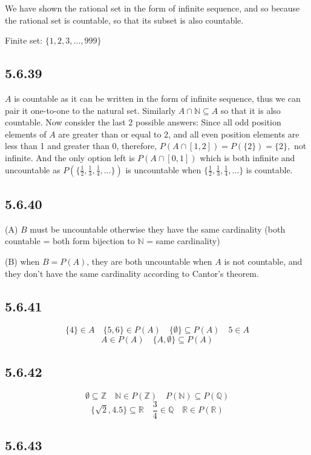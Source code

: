 \documentclass{article}
\begin{document}
We have shown the rational set in the form of infinite sequence, and so because the rational set is countable, so that its subset is also countable.

Finite set: $\{1, 2, 3,\ldots, 999\}$

\subsection*{5.6.39}

$A$ is countable as it can be written in the form of infinite sequence, thus we can pair it one-to-one to the natural set. Similarly $A\cap\mathbb{N}\subseteq A$ so that it is also countable.  Now consider the last 2 possible answers: Since all odd position elements of $A$ are greater than or equal to 2, and all even position elements are less than 1 and greater than 0, therefore, $P(A\cap[1,2])=P(\{2\})=\{2\},$ not infinite. And the only option left is $P(A\cap[0,1])$ which is both infinite and uncountable as $P(\{\frac12,\frac13,\frac14,\ldots\})$ is uncountable when $\{\frac12,\frac13,\frac14,\ldots\}$ is countable. 

\subsection*{5.6.40}

(A) $B$ must be uncountable otherwise they have the same cardinality (both countable = both form bijection to $\mathbb{N}$ = same cardinality) 

(B) when $B=P(A)$, they are both uncountable when $A$ is not countable, and they don't have the same cardinality according to Cantor's theorem.

\subsection*{5.6.41}

$$\{4\}\in A\quad \{5,6\}\in P(A)\quad \{\emptyset\}\subseteq P(A)\quad 5\in A$$
$$A\in P(A)\quad \{A,\emptyset\}\subseteq P(A)$$

\subsection*{5.6.42}

$$\emptyset\subseteq\mathbb{Z}\quad\mathbb{N}\in P(\mathbb{Z})\quad P(\mathbb{N})\subseteq P(\mathbb{Q})$$
$$\{\sqrt2,4.5\}\subseteq \mathbb{R}\quad\frac34\in\mathbb{Q}\quad\mathbb{R}\in P(\mathbb{R})$$
\subsection*{5.6.43}
\end{document}
